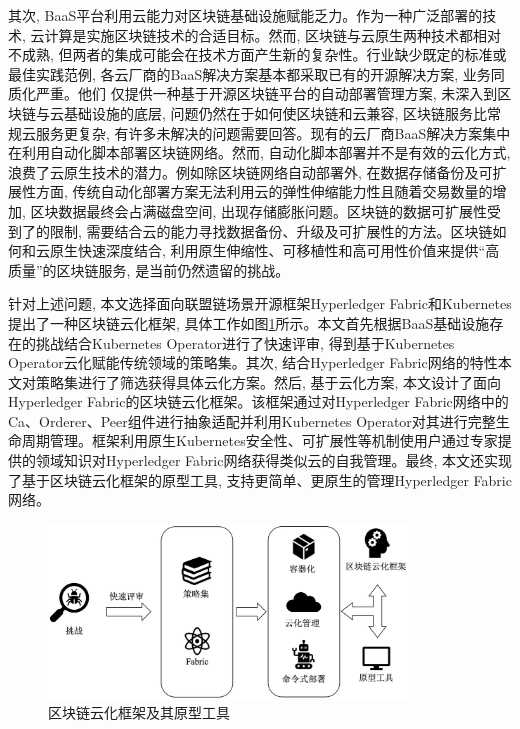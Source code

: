 其次, BaaS平台利用云能力对区块链基础设施赋能乏力。作为一种广泛部署的技术, 云计算是实施区块链技术的合适目标。然而, 区块链与云原生两种技术都相对不成熟, 但两者的集成可能会在技术方面产生新的复杂性\cite{onik2019performance}。行业缺少既定的标准或最佳实践范例, 各云厂商的BaaS解决方案基本都采取已有的开源解决方案, 业务同质化严重。他们 仅提供一种基于开源区块链平台的自动部署管理方案, 未深入到区块链与云基础设施的底层, 问题仍然在于如何使区块链和云兼容\cite{gai2020blockchain}, 区块链服务比常规云服务更复杂, 有许多未解决的问题需要回答。现有的云厂商BaaS解决方案集中在利用自动化脚本部署区块链网络。然而, 自动化脚本部署并不是有效的云化方式, 浪费了云原生技术的潜力。例如除区块链网络自动部署外, 在数据存储备份及可扩展性方面, 传统自动化部署方案无法利用云的弹性伸缩能力性且随着交易数量的增加, 区块数据最终会占满磁盘空间, 出现存储膨胀问题。区块链的数据可扩展性受到了的限制, 需要结合云的能力寻找数据备份、升级及可扩展性的方法。区块链如何和云原生快速深度结合, 利用原生伸缩性、可移植性和高可用性价值来提供“高质量”的区块链服务, 是当前仍然遗留的挑战。

针对上述问题, 本文选择面向联盟链场景开源框架Hyperledger Fabric和Kubernetes提出了一种区块链云化框架, 具体工作如图\ref{framework_tool}所示。本文首先根据BaaS基础设施存在的挑战结合Kubernetes Operator进行了快速评审, 得到基于Kubernetes Operator云化赋能传统领域的策略集。其次, 结合Hyperledger Fabric网络的特性本文对策略集进行了筛选获得具体云化方案。然后, 基于云化方案, 本文设计了面向Hyperledger Fabric的区块链云化框架。该框架通过对Hyperledger Fabric网络中的Ca、Orderer、Peer组件进行抽象适配并利用Kubernetes Operator对其进行完整生命周期管理。框架利用原生Kubernetes安全性、可扩展性等机制使用户通过专家提供的领域知识对Hyperledger Fabric网络获得类似云的自我管理。最终, 本文还实现了基于区块链云化框架的原型工具, 支持更简单、更原生的管理Hyperledger Fabric网络。

\begin{figure}[h] %
    \centering %
    \includegraphics[width=0.85\textwidth]{FIGs/chapter1/process.png} %
    \caption{区块链云化框架及其原型工具} %
    \label{framework_tool} %
\end{figure}%

